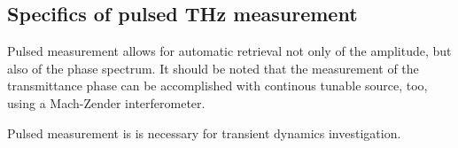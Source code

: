 
\subsection{Specifics of pulsed THz measurement}
Pulsed measurement allows for automatic retrieval not only of the amplitude, but also of the phase spectrum. It should be noted that the measurement of the transmittance phase can be accomplished with continous tunable source, too, using a Mach-Zender interferometer.

Pulsed measurement is is necessary for transient dynamics investigation.



